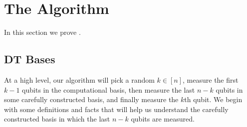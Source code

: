 
\section{The Algorithm}

In this section we prove .

\subsection{DT Bases}
At a high level, our algorithm will pick a random $k\in [n]$, measure the first $k-1$ qubits in the computational basis, then measure the last $n-k$ qubits in some carefully constructed basis, and finally measure the $k$th qubit. We begin with some definitions and facts that will help us understand the carefully constructed basis in which the last $n-k$ qubits are measured.
